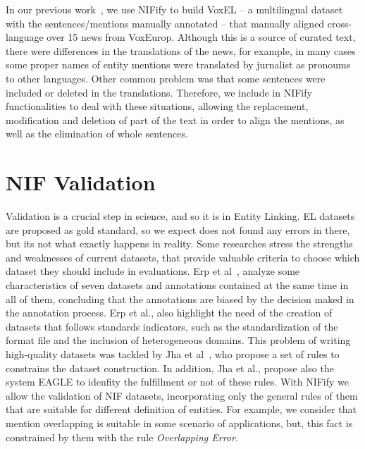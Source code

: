 \documentclass{llncs}
\begin{document}
In our previous work~\cite{VoxEL2018}, we use NIFify to build VoxEL -- a multilingual dataset with the sentences/mentions manually annotated -- that manually aligned cross-language over 15 news from VoxEurop. Although this is a source of curated text, there were differences in the translations of the news, for example, in many cases some proper names of entity mentions were translated by jurnalist as pronoums to other languages. Other common problem was that some sentences were included or deleted in the translations. Therefore, we include in NIFify functionalities to deal with these situations, allowing the replacement, modification and deletion of part of the text in order to align the mentions, as well as the elimination of whole sentences. 

\section{NIF Validation}


Validation is a crucial step in science, and so it is in Entity Linking. EL datasets are proposed as gold standard, so we expect does not found any errors in there, but its not what exactly happens in reality. Some researches stress the strengths and weaknesses of current datasets, that provide valuable criteria to choose which dataset they should include in evaluations. Erp et al~\cite{Marieke2016}, analyze some characteristics of seven datasets and annotations contained at the same time in all of them, concluding that the annotations are biased by the decision maked in the annotation process. Erp et al., also highlight the need of the creation of datasets that follows standards indicators, such as the standardization of the format file and the inclusion of heterogeneous domains. This problem of writing high-quality datasets was tackled by Jha et al~\cite{Kunal2017}, who propose a set of rules to constrains the dataset construction. In addition, Jha et al., propose also the system EAGLE to idenfity the fulfillment or not of these rules. With NIFify we allow the validation of NIF datasets, incorporating only the general rules of them that are suitable for different definition of entities. For example, we consider that mention overlapping is suitable in some scenario of applications, but, this fact is constrained by them with the rule \textit{Overlapping Error}.
\end{document}
